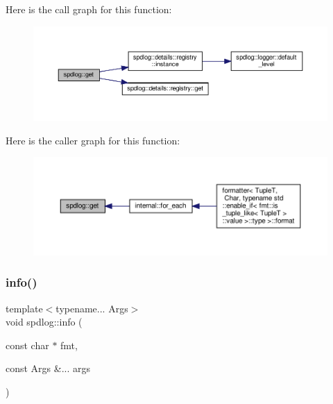 Here is the call graph for this function\+:
\nopagebreak
\begin{figure}[H]
\begin{center}
\leavevmode
\includegraphics[width=350pt]{namespacespdlog_a658d68d4ebdb11793b1e78582f108674_cgraph}
\end{center}
\end{figure}
Here is the caller graph for this function\+:
\nopagebreak
\begin{figure}[H]
\begin{center}
\leavevmode
\includegraphics[width=350pt]{namespacespdlog_a658d68d4ebdb11793b1e78582f108674_icgraph}
\end{center}
\end{figure}
\mbox{\label{namespacespdlog_a3ee2e37859d2eee2722afc8ac26319ae}} 
\subsubsection{\texorpdfstring{info()}{info()}\hspace{0.1cm}{\footnotesize\ttfamily [1/2]}}
{\footnotesize\ttfamily template$<$typename... Args$>$ \\
void spdlog\+::info (\begin{DoxyParamCaption}\item[{const char $\ast$}]{fmt,  }\item[{const Args \&...}]{args }\end{DoxyParamCaption})\hspace{0.3cm}{\ttfamily [inline]}}



